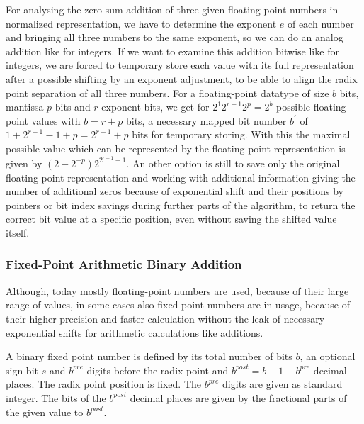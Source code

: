 For analysing the zero sum addition of three given floating-point numbers in normalized representation, we have to determine the exponent $e$ of each number and bringing all three numbers to the same exponent, so we can do an analog addition like for integers. If we want to examine this addition bitwise like for integers, we are forced to temporary store each value with its full representation after a possible shifting by an exponent adjustment, to be able to align the radix point separation of all three numbers. For a floating-point datatype of size $b$ bits, mantissa $p$ bits and $r$ exponent bits, we get for $2^{1} 2^{r-1} 2^{p} = 2^{b}$ possible floating-point values with $b = r + p$ bits, a necessary mapped bit number $b^{\prime}$ of $1 + 2^{r-1} - 1 + p = 2^{r-1} + p$ bits for temporary storing. With this the maximal possible value which can be represented by the floating-point representation is given by $\left(2 - 2^{-p}\right)2^{2^{r-1} - 1}$. An other option is still to save only the original floating-point representation and working with additional information giving the number of additional zeros because of exponential shift and their positions by pointers or bit index savings during further parts of the algorithm, to return the correct bit value at a specific position, even without saving the shifted value itself.
\subsubsection{Fixed-Point Arithmetic Binary Addition}
\label{sss:fixedpointarithmeticbinaryaddition}
Although, today mostly floating-point numbers are used, because of their large range of values, in some cases also fixed-point numbers are in usage, because of their higher precision and faster calculation without the leak of necessary exponential shifts for arithmetic calculations like additions.

\begin{definition}

    A binary fixed point number is defined by its total number of bits $b$, an optional sign bit $s$ and $b^{pre}$ digits before the radix point and $b^{post} = b - 1 - b^{pre}$ decimal places. The radix point position is fixed. The $b^{pre}$ digits are given as standard integer. The bits of the $b^{post}$ decimal places are given by the fractional parts of the given value to $b^{post}$.

\label{def:fixedpointrepresentation}
\end{definition}


